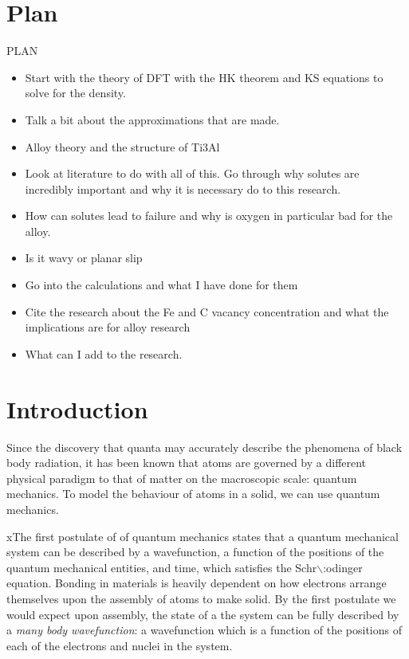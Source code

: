\documentclass[11pt]{article}
\date{\today}
\title{}
\begin{document}
\tableofcontents



\section{Plan}
\label{sec:orgebfada5}

PLAN 

\begin{itemize}
\item Start with the theory of DFT with the HK theorem and KS equations to solve
for the density.
\item Talk a bit about the approximations that are made.
\item Alloy theory and the structure of Ti3Al
\item Look at literature to do with all of this. Go through why solutes are
incredibly important and why it is necessary do to this research.
\item How can solutes lead to failure and why is oxygen in particular bad for the alloy.
\item Is it wavy or planar slip
\item Go into the calculations and what I have done for them
\item Cite the research about the Fe and C vacancy concentration and what the
implications are for alloy research
\item What can I add to the research.
\end{itemize}

\section{Introduction}
\label{sec:orge62c585}

Since the discovery that quanta may accurately describe the phenomena of black body radiation,
it has been known that atoms are governed by a different physical paradigm to that of matter on
the macroscopic scale: quantum mechanics. To model the behaviour of atoms in a solid, we can
use quantum mechanics.

xThe first postulate of of quantum mechanics states that a quantum mechanical system can be
described by a wavefunction, a function of the positions of the quantum mechanical entities,
and time, which satisfies the Schr$\backslash$:odinger equation. Bonding in materials is heavily dependent
on how electrons arrange themselves upon the assembly of atoms to make solid. By the first postulate we
would expect upon assembly, the state of a the system can be fully described by a \emph{many body
wavefunction}: a wavefunction which is a function of the positions of each of the electrons and
nuclei in the system.
\end{document}
